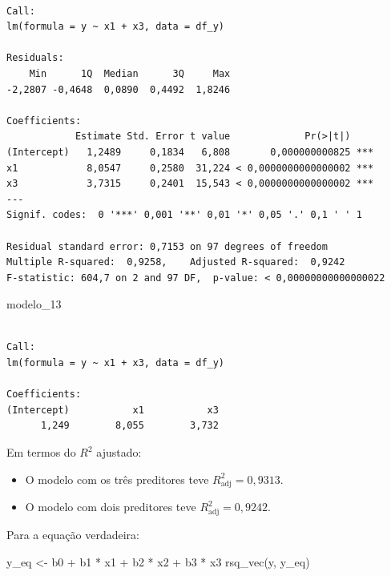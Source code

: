\documentclass[
  letterpaper,
  DIV=11,
  numbers=noendperiod]{scrreprt}
\newenvironment{Shaded}{\begin{snugshade}}{\end{snugshade}}
\newcommand{\FunctionTok}[1]{\textcolor[rgb]{0.28,0.35,0.67}{#1}}
\newcommand{\NormalTok}[1]{\textcolor[rgb]{0.00,0.23,0.31}{#1}}
\newcommand{\OtherTok}[1]{\textcolor[rgb]{0.00,0.23,0.31}{#1}}
\newcommand{\SpecialCharTok}[1]{\textcolor[rgb]{0.37,0.37,0.37}{#1}}
\providecommand{\tightlist}{%
  \setlength{\itemsep}{0pt}\setlength{\parskip}{0pt}}\usepackage{longtable,booktabs,array}
\begin{document}
\begin{verbatim}

Call:
lm(formula = y ~ x1 + x3, data = df_y)

Residuals:
    Min      1Q  Median      3Q     Max 
-2,2807 -0,4648  0,0890  0,4492  1,8246 

Coefficients:
            Estimate Std. Error t value             Pr(>|t|)    
(Intercept)   1,2489     0,1834   6,808       0,000000000825 ***
x1            8,0547     0,2580  31,224 < 0,0000000000000002 ***
x3            3,7315     0,2401  15,543 < 0,0000000000000002 ***
---
Signif. codes:  0 '***' 0,001 '**' 0,01 '*' 0,05 '.' 0,1 ' ' 1

Residual standard error: 0,7153 on 97 degrees of freedom
Multiple R-squared:  0,9258,    Adjusted R-squared:  0,9242 
F-statistic: 604,7 on 2 and 97 DF,  p-value: < 0,00000000000000022
\end{verbatim}

\begin{Shaded}
\begin{Highlighting}[]
\NormalTok{modelo\_13}
\end{Highlighting}
\end{Shaded}

\begin{verbatim}

Call:
lm(formula = y ~ x1 + x3, data = df_y)

Coefficients:
(Intercept)           x1           x3  
      1,249        8,055        3,732  
\end{verbatim}

Em termos do $R^2$ ajustado:

\begin{itemize}
\tightlist
\item
  O modelo com os três preditores teve $R^2_{\text{adj}} = 0{,}9313$.
\item
  O modelo com dois preditores teve $R^2_{\text{adj}} = 0{,}9242$.
\end{itemize}

Para a equação verdadeira:

\begin{Shaded}
\begin{Highlighting}[]
\NormalTok{y\_eq }\OtherTok{\textless{}{-}}\NormalTok{ b0 }\SpecialCharTok{+}\NormalTok{ b1 }\SpecialCharTok{*}\NormalTok{ x1 }\SpecialCharTok{+}\NormalTok{ b2 }\SpecialCharTok{*}\NormalTok{ x2 }\SpecialCharTok{+}\NormalTok{ b3 }\SpecialCharTok{*}\NormalTok{ x3}
\FunctionTok{rsq\_vec}\NormalTok{(y, y\_eq)}
\end{Highlighting}
\end{Shaded}
\end{document}
